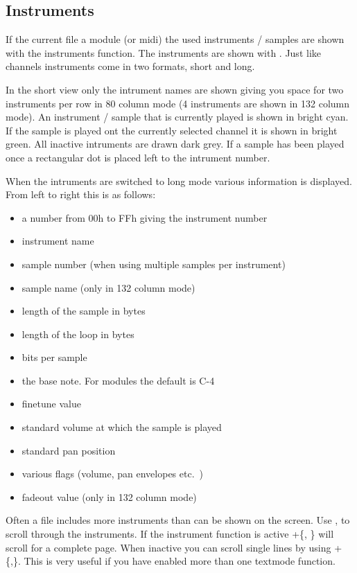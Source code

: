 \subsection{Instruments}
If the current file a module (or midi) the used instruments / samples
are shown with the instruments function. The instruments are shown
with . Just like channels instruments come in two formats,
short and long.

In the short view only the intrument names are shown giving you space
for two instruments per row in 80 column mode (4 instruments are shown
in 132 column mode). An instrument / sample that is currently played
is shown in bright cyan. If the sample is played ont the currently
selected channel it is shown in bright green. All inactive intruments
are drawn dark grey. If a sample has been played once a rectangular
dot is placed left to the intrument number.

When the intruments are switched to long mode various information is
displayed.  From left to right this is as follows:
\begin{itemize}
\item a number from 00h to FFh giving the instrument number
\item instrument name
\item sample number (when using multiple samples per instrument)
\item sample name (only in 132 column mode)
\item length of the sample in bytes
\item length of the loop in bytes
\item bits per sample
\item the base note. For modules the default is C-4
\item finetune value
\item standard volume at which the sample is played
\item standard pan position
\item various flags (volume, pan envelopes etc.\ )
\item fadeout value (only in 132 column mode)
\end{itemize}

Often a file includes more instruments than can be shown on the
screen. Use
, to scroll through the instruments. If the
instrument function is active +\{,
\} will scroll for a complete page. When inactive you can
scroll single lines by using
+\{,\}. This is very useful if you
have enabled more than one textmode function.

